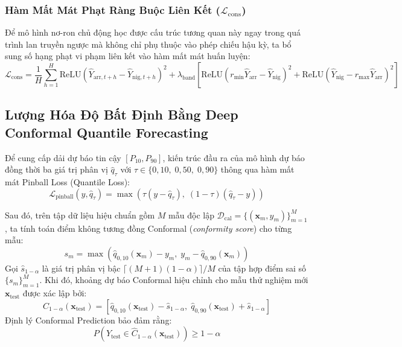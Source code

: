 \subsubsection{Hàm Mất Mát Phạt Ràng Buộc Liên Kết ($\mathcal{L}_{\text{cons}}$)}
Để mô hình nơ-ron chủ động học được cấu trúc tương quan này ngay trong quá trình lan truyền ngược mà không chỉ phụ thuộc vào phép chiếu hậu kỳ, ta bổ sung số hạng phạt vi phạm liên kết vào hàm mất mát huấn luyện:
\begin{equation}
    \mathcal{L}_{\text{cons}} = \frac{1}{H} \sum_{h=1}^H \text{ReLU}\left( \hat{Y}_{\text{arr}, t+h} - \hat{Y}_{\text{nig}, t+h} \right)^2 + \lambda_{\text{band}} \left[ \text{ReLU}\left( r_{\min} \hat{Y}_{\text{arr}} - \hat{Y}_{\text{nig}} \right)^2 + \text{ReLU}\left( \hat{Y}_{\text{nig}} - r_{\max} \hat{Y}_{\text{arr}} \right)^2 \right]
\end{equation}

\subsection{Lượng Hóa Độ Bất Định Bằng Deep Conformal Quantile Forecasting}
\label{subsec:conformal_prediction}
Để cung cấp dải dự báo tin cậy $[P_{10}, P_{90}]$, kiến trúc đầu ra của mô hình dự báo đồng thời ba giá trị phân vị $\hat{q}_{\tau}$ với $\tau \in \{0{,}10, \; 0{,}50, \; 0{,}90\}$ thông qua hàm mất mát Pinball Loss (Quantile Loss):
\begin{equation}
    \mathcal{L}_{\text{pinball}}(y, \hat{q}_\tau) = \max\left( \tau (y - \hat{q}_\tau), \; (1 - \tau) (\hat{q}_\tau - y) \right)
\end{equation}

Sau đó, trên tập dữ liệu hiệu chuẩn gồm $M$ mẫu độc lập $\mathcal{D}_{\text{cal}} = \{(\mathbf{x}_m, y_m)\}_{m=1}^M$, ta tính toán điểm không tương đồng Conformal (\textit{conformity score}) cho từng mẫu:
\begin{equation}
    s_m = \max\left( \hat{q}_{0{,}10}(\mathbf{x}_m) - y_m, \; y_m - \hat{q}_{0{,}90}(\mathbf{x}_m) \right)
\end{equation}
Gọi $\hat{s}_{1-\alpha}$ là giá trị phân vị bậc $\lceil (M + 1)(1 - \alpha) \rceil / M$ của tập hợp điểm sai số $\{s_m\}_{m=1}^M$. Khi đó, khoảng dự báo Conformal hiệu chỉnh cho mẫu thử nghiệm mới $\mathbf{x}_{\text{test}}$ được xác lập bởi:
\begin{equation}
    \hat{C}_{1-\alpha}(\mathbf{x}_{\text{test}}) = \left[ \hat{q}_{0{,}10}(\mathbf{x}_{\text{test}}) - \hat{s}_{1-\alpha}, \; \hat{q}_{0{,}90}(\mathbf{x}_{\text{test}}) + \hat{s}_{1-\alpha} \right]
\end{equation}
Định lý Conformal Prediction bảo đảm rằng:
\begin{equation}
    P\left( Y_{\text{test}} \in \hat{C}_{1-\alpha}(\mathbf{x}_{\text{test}}) \right) \ge 1 - \alpha
\end{equation}

